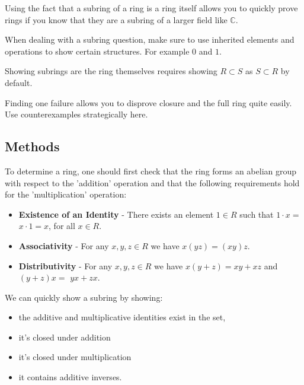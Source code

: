 \begin{mistake}
  Using the fact that a subring of a ring is a ring itself allows you to quickly prove rings if you know that they are a subring of a larger field like $\mathbb{C}$.
\end{mistake}

\begin{mistake}
  When dealing with a subring question, make sure to use inherited elements and operations to show certain structures. For example $0$ and $1$.
\end{mistake}

\begin{mistake}
  Showing subrings are the ring themselves requires showing $R \subset S$ as $S \subset R$ by default.
\end{mistake}

\begin{mistake}
  Finding one failure allows you to disprove closure and the full ring quite easily. Use counterexamples strategically here.
\end{mistake}


\subsection{Methods}

\begin{method}
  To determine a ring, one should first check that the ring forms an abelian group with respect to the 'addition' operation and that the following requirements hold for the 'multiplication' operation:

\begin{itemize}
   \item[i)] \textbf{Existence of an Identity} - There exists an element $1 \in R$ such that $1 \cdot x=$ $x \cdot 1=x$, for all $x \in R$.
  \item[ii)] \textbf{Associativity} - For any $x, y, z \in R$ we have $x(y z)=(x y) z$.
  \item[iii)] \textbf{Distributivity} - For any $x, y, z \in R$ we have $x(y+z)=x y+x z$ and $(y+z) x=$ $y x+z x$. 
\end{itemize}

\end{method}


\begin{method}
  We can quickly show a subring by showing:

  \begin{itemize}
    \item the additive and multiplicative identities exist in the set,
    \item it's closed under addition
    \item it's closed under multiplication
    \item it contains additive inverses.
  \end{itemize}
  \end{method}


